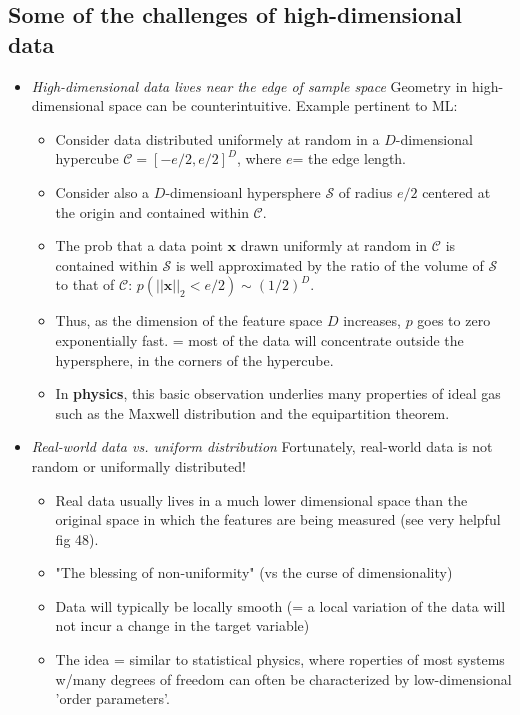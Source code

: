 \documentclass[norsk,a4paper,11pt]{article}
\begin{document}
\subsection{Some of the challenges of high-dimensional data}
\begin{itemize}
	\item \textit{High-dimensional data lives near the edge of sample space}
	Geometry in high-dimensional space can be counterintuitive. Example pertinent to ML: 
	\begin{itemize}
		\item Consider data distributed uniformely at random in a $D$-dimensional hypercube $\mathcal{C} = [-e/2, e/2]^D$, where $e$= the edge length.
		\item Consider also a $D$-dimensioanl hypersphere $\mathcal{S}$ of radius $e/2$ centered at the origin and contained within $\mathcal{C}$.
		\item The prob that a data point $\bm{x}$ drawn uniformly at random in $\mathcal{C}$ is contained within $\mathcal{S}$ is well approximated by the ratio of the volume of $\mathcal{S}$ to that of $\mathcal{C}$: 
		$p(||\bm{x}||_2 < e/2) \sim (1/2)^D$.
		\item Thus, as the dimension of the feature space $D$ increases, $p$ goes to zero exponentially fast. = most of the data will concentrate outside the hypersphere, in the corners of the hypercube.
		\item In \textbf{physics}, this basic observation underlies many properties of ideal gas such as the Maxwell distribution and the equipartition theorem.
	\end{itemize}
	\item \textit{Real-world data vs. uniform distribution}
	Fortunately, real-world data is not random or uniformally distributed!
	\begin{itemize}
		\item Real data usually lives in a much lower dimensional space than the original space in which the features are being measured (see very helpful fig 48). 
		\item "The blessing of non-uniformity" (vs the curse of dimensionality)
		\item Data will typically be locally smooth (= a local variation of the data will not incur a change in the target variable)
		\item The idea = similar to statistical physics, where roperties of most systems w/many degrees of freedom can often be characterized by low-dimensional 'order parameters'. 

\end{itemize}
\end{itemize}
\end{document}

